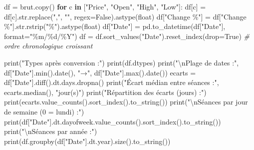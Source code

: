 \documentclass[
  10pt,
]{article}
\newenvironment{Shaded}{}{}
\newcommand{\BuiltInTok}[1]{\textcolor[rgb]{0.00,0.50,0.00}{#1}}
\newcommand{\CharTok}[1]{\textcolor[rgb]{0.25,0.44,0.63}{#1}}
\newcommand{\CommentTok}[1]{\textcolor[rgb]{0.38,0.63,0.69}{\textit{#1}}}
\newcommand{\ControlFlowTok}[1]{\textcolor[rgb]{0.00,0.44,0.13}{\textbf{#1}}}
\newcommand{\KeywordTok}[1]{\textcolor[rgb]{0.00,0.44,0.13}{\textbf{#1}}}
\newcommand{\NormalTok}[1]{#1}
\newcommand{\OperatorTok}[1]{\textcolor[rgb]{0.40,0.40,0.40}{#1}}
\newcommand{\SpecialCharTok}[1]{\textcolor[rgb]{0.25,0.44,0.63}{#1}}
\newcommand{\StringTok}[1]{\textcolor[rgb]{0.25,0.44,0.63}{#1}}
\newcommand{\VariableTok}[1]{\textcolor[rgb]{0.10,0.09,0.49}{#1}}
\begin{document}
\begin{Shaded}
\begin{Highlighting}[]
\NormalTok{df }\OperatorTok{=}\NormalTok{ brut.copy()}
\ControlFlowTok{for}\NormalTok{ c }\KeywordTok{in}\NormalTok{ [}\StringTok{"Price"}\NormalTok{, }\StringTok{"Open"}\NormalTok{, }\StringTok{"High"}\NormalTok{, }\StringTok{"Low"}\NormalTok{]:}
\NormalTok{    df[c] }\OperatorTok{=}\NormalTok{ df[c].}\BuiltInTok{str}\NormalTok{.replace(}\StringTok{","}\NormalTok{, }\StringTok{""}\NormalTok{, regex}\OperatorTok{=}\VariableTok{False}\NormalTok{).astype(}\BuiltInTok{float}\NormalTok{)}
\NormalTok{df[}\StringTok{"Change \%"}\NormalTok{] }\OperatorTok{=}\NormalTok{ df[}\StringTok{"Change \%"}\NormalTok{].}\BuiltInTok{str}\NormalTok{.rstrip(}\StringTok{"\%"}\NormalTok{).astype(}\BuiltInTok{float}\NormalTok{)}
\NormalTok{df[}\StringTok{"Date"}\NormalTok{] }\OperatorTok{=}\NormalTok{ pd.to\_datetime(df[}\StringTok{"Date"}\NormalTok{], }\BuiltInTok{format}\OperatorTok{=}\StringTok{"\%m/}\SpecialCharTok{\%d}\StringTok{/\%Y"}\NormalTok{)}
\NormalTok{df }\OperatorTok{=}\NormalTok{ df.sort\_values(}\StringTok{"Date"}\NormalTok{).reset\_index(drop}\OperatorTok{=}\VariableTok{True}\NormalTok{)      }\CommentTok{\# ordre chronologique croissant}

\BuiltInTok{print}\NormalTok{(}\StringTok{"Types après conversion :"}\NormalTok{)}
\BuiltInTok{print}\NormalTok{(df.dtypes)}
\BuiltInTok{print}\NormalTok{(}\StringTok{"}\CharTok{\textbackslash{}n}\StringTok{Plage de dates :"}\NormalTok{, df[}\StringTok{"Date"}\NormalTok{].}\BuiltInTok{min}\NormalTok{().date(), }\StringTok{"→"}\NormalTok{, df[}\StringTok{"Date"}\NormalTok{].}\BuiltInTok{max}\NormalTok{().date())}
\NormalTok{ecarts }\OperatorTok{=}\NormalTok{ df[}\StringTok{"Date"}\NormalTok{].diff().dt.days.dropna()}
\BuiltInTok{print}\NormalTok{(}\StringTok{"Écart médian entre séances :"}\NormalTok{, ecarts.median(), }\StringTok{"jour(s)"}\NormalTok{)}
\BuiltInTok{print}\NormalTok{(}\StringTok{"Répartition des écarts (jours) :"}\NormalTok{)}
\BuiltInTok{print}\NormalTok{(ecarts.value\_counts().sort\_index().to\_string())}
\BuiltInTok{print}\NormalTok{(}\StringTok{"}\CharTok{\textbackslash{}n}\StringTok{Séances par jour de semaine (0 = lundi) :"}\NormalTok{)}
\BuiltInTok{print}\NormalTok{(df[}\StringTok{"Date"}\NormalTok{].dt.dayofweek.value\_counts().sort\_index().to\_string())}
\BuiltInTok{print}\NormalTok{(}\StringTok{"}\CharTok{\textbackslash{}n}\StringTok{Séances par année :"}\NormalTok{)}
\BuiltInTok{print}\NormalTok{(df.groupby(df[}\StringTok{"Date"}\NormalTok{].dt.year).size().to\_string())}
\end{Highlighting}
\end{Shaded}
\end{document}
